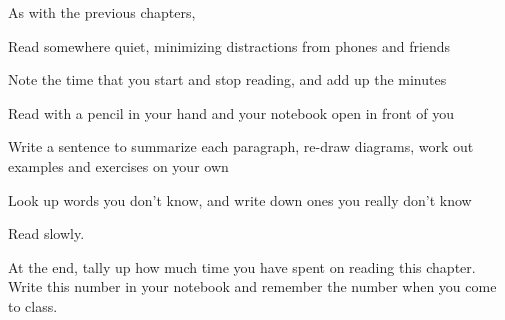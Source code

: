 \noindent As with the previous chapters,
\blist{0.0in}
\item Read somewhere quiet, minimizing distractions from phones and friends
\item Note the time that you start and stop reading, and add up the minutes
\item Read with a pencil in your hand and your notebook open in front of you
\item Write a sentence to summarize each paragraph, re-draw diagrams, work out examples and exercises on your own
\item Look up words you don't know, and write down ones you really don't know
\item Read slowly.
\item At the end, tally up how much time you have spent on reading this chapter.
Write this number in your notebook and remember the number when you come to class.
\elist

\vfill          %
